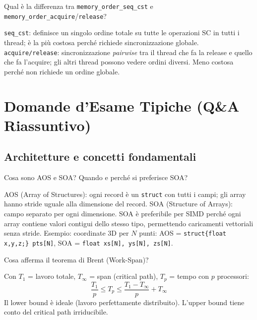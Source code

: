 \documentclass[11pt,a4paper]{article}
\theoremstyle{remark}
\newenvironment{esercizio}[1][]{%
  \begin{tcolorbox}[breakable,title={\textbf{Esercizio / Domanda d'esame}\ifx&#1&\else: #1\fi},
    colback=yellow!5!white, colframe=orange!75!black, fonttitle=\small\bfseries]%
}{%
  \end{tcolorbox}%
}
\newenvironment{risposta}{%
  \begin{tcolorbox}[breakable,title={\textbf{Risposta}},
    colback=green!5!white, colframe=green!50!black, fonttitle=\small\bfseries]%
}{%
  \end{tcolorbox}%
}
\begin{document}
\begin{esercizio}
Qual è la differenza tra \texttt{memory\_order\_seq\_cst} e \texttt{memory\_order\_acquire}/\texttt{release}?
\end{esercizio}
\begin{risposta}
\texttt{seq\_cst}: definisce un singolo ordine totale su tutte le operazioni SC in tutti i thread; è la più costosa perché richiede sincronizzazione globale. \texttt{acquire/release}: sincronizzazione \emph{pairwise} tra il thread che fa la release e quello che fa l'acquire; gli altri thread possono vedere ordini diversi. Meno costosa perché non richiede un ordine globale.
\end{risposta}

\section{Domande d'Esame Tipiche (Q\&A Riassuntivo)}

\subsection{Architetture e concetti fondamentali}

\begin{esercizio}
Cosa sono AOS e SOA? Quando e perché si preferisce SOA?
\end{esercizio}
\begin{risposta}
AOS (Array of Structures): ogni record è un \texttt{struct} con tutti i campi; gli array hanno stride uguale alla dimensione del record. SOA (Structure of Arrays): campo separato per ogni dimensione. SOA è preferibile per SIMD perché ogni array contiene valori contigui dello stesso tipo, permettendo caricamenti vettoriali senza stride. Esempio: coordinate 3D per $N$ punti: AOS = \texttt{struct\{float x,y,z;\} pts[N]}, SOA = \texttt{float xs[N], ys[N], zs[N]}.
\end{risposta}

\begin{esercizio}
Cosa afferma il teorema di Brent (Work-Span)?
\end{esercizio}
\begin{risposta}
Con $T_1$ = lavoro totale, $T_\infty$ = span (critical path), $T_p$ = tempo con $p$ processori:
\[
  \frac{T_1}{p} \leq T_p \leq \frac{T_1 - T_\infty}{p} + T_\infty
\]
Il lower bound è ideale (lavoro perfettamente distribuito). L'upper bound tiene conto del critical path irriducibile.
\end{risposta}
\end{document}
